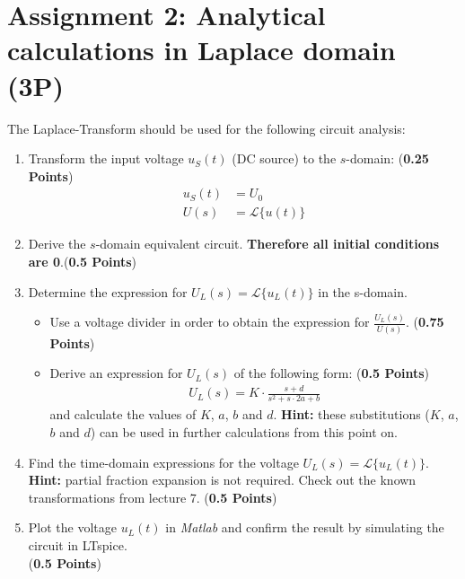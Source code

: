 \documentclass[a4paper]{article}
\begin{document}
	\section*{Assignment 2: Analytical  calculations in Laplace domain (3P)}
The Laplace-Transform should be used for the following circuit analysis:
\begin{enumerate}
	\item Transform the input voltage $u_S(t)$ (DC source) to the $s$-domain: (\textbf{0.25 Points})
	\begin{align*}
	u_S(t)&= U_0\\
	U(s) &= \mathcal{L}\{u(t)\}
	\end{align*}
	\item Derive the $s$-domain equivalent circuit. \textbf{Therefore all initial conditions are 0}.(\textbf{0.5 Points}) 
	\item Determine the expression for $U_L(s) = \mathcal{L}\{u_L(t)\}$ in the s-domain. 
	\begin{itemize}
	\item Use a voltage divider in order to obtain the expression for $\frac{U_L(s)}{U(s)}$. (\textbf{0.75 Points})
	\item Derive an expression for $U_L(s)$ of the following form: (\textbf{0.5 Points})
	\begin{align*}
		U_L(s) = K\cdot \frac{s+d}{s^2+s\cdot 2a+b}
	\end{align*}
	and calculate the values of $K$, $a$, $b$ and $d$. \textbf{Hint:} these substitutions ($K$, $a$, $b$ and $d$) can be used in further calculations from this point on.
	\end{itemize}
	\item Find the time-domain expressions for the voltage $U_L(s) = \mathcal{L}\{u_L(t)\}$. \\
	\textbf{Hint:} partial fraction expansion is not required. Check out the known transformations from lecture 7. (\textbf{0.5 Points})
	\item Plot the voltage $u_L(t)$ in \textit{Matlab} and confirm the result by simulating the circuit in LTspice.\\(\textbf{0.5 Points})
\end{enumerate}
\pagebreak
\end{document}
